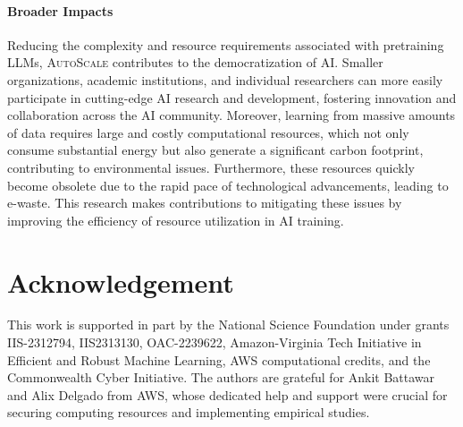 \documentclass{article} %
\newcommand{\kang}[1]{\textbf{\textcolor{cyan}{[Feiyang: #1]}}}
\begin{document}



\paragraph{Broader Impacts}
Reducing the complexity and resource requirements associated with pretraining LLMs, \textsc{AutoScale} contributes to the democratization of AI. Smaller organizations, academic institutions, and individual researchers can more easily participate in cutting-edge AI research and development, fostering innovation and collaboration across the AI community.  Moreover, learning from massive amounts of data requires large and costly computational resources, which not only consume substantial energy but also generate a significant carbon footprint, contributing to environmental issues. Furthermore, these resources quickly become obsolete due to the rapid pace of technological advancements, leading to e-waste. This research makes contributions to mitigating these issues by improving the efficiency of resource utilization in AI training.

\section*{Acknowledgement}
This work is supported in part by the National Science Foundation under grants IIS-2312794, IIS2313130, OAC-2239622, Amazon-Virginia Tech Initiative in Efficient and Robust Machine Learning, AWS computational credits, and the Commonwealth Cyber Initiative. The authors are grateful for Ankit Battawar and Alix Delgado from AWS, whose dedicated help and support were crucial for securing computing resources and implementing empirical studies.
\end{document}
